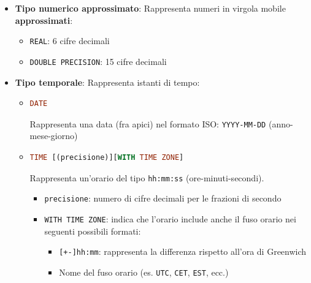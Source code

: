 \documentclass[a4paper]{article}
\begin{document}
\begin{itemize}
\begin{itemize}
      \item Valori decimali:
        \begin{itemize}
          \item 
\begin{lstlisting}[language=SQL, numbers=none]
NUMERIC | DECIMAL [(precisione [, scala])]
\end{lstlisting}
            \begin{itemize}
              \item \texttt{precisione}: numero totale di cifre (intere + decimali)
              \item \texttt{scala}: numero di cifre decimali
              \item \texttt{|}: indica che è possibile utilizzare sia \texttt{NUMERIC} che \texttt{DECIMAL}
            \end{itemize}
        \end{itemize}
    \end{itemize}

  \item \textbf{Tipo numerico approssimato}:
    Rappresenta numeri in virgola mobile \textbf{approssimati}:
    \begin{itemize}
      \item \texttt{REAL}: 6 cifre decimali
      \item \texttt{DOUBLE PRECISION}: 15 cifre decimali
    \end{itemize}

  \item \textbf{Tipo temporale}:
    Rappresenta istanti di tempo:
    \begin{itemize}
      \item 
\begin{lstlisting}[language=SQL, numbers=none]
DATE
\end{lstlisting}
        Rappresenta una data (fra apici) nel formato ISO: \texttt{YYYY-MM-DD} (anno-mese-giorno)

      \item 
\begin{lstlisting}[language=SQL, numbers=none]
TIME [(precisione)][WITH TIME ZONE]
\end{lstlisting}
      Rappresenta un'orario del tipo \texttt{hh:mm:ss} (ore-minuti-secondi). 
      \begin{itemize}
        \item \texttt{precisione}: numero di cifre decimali per le frazioni di secondo
        \item \texttt{WITH TIME ZONE}: indica che l'orario include anche il fuso orario
          nei seguenti possibili formati:
          \begin{itemize}
            \item \texttt{[+-]hh:mm}: rappresenta la differenza rispetto all'ora di
              Greenwich
            \item Nome del fuso orario (es. \texttt{UTC}, \texttt{CET}, \texttt{EST}, ecc.)
          \end{itemize}
      \end{itemize}


\end{itemize}
\end{itemize}
\end{document}
